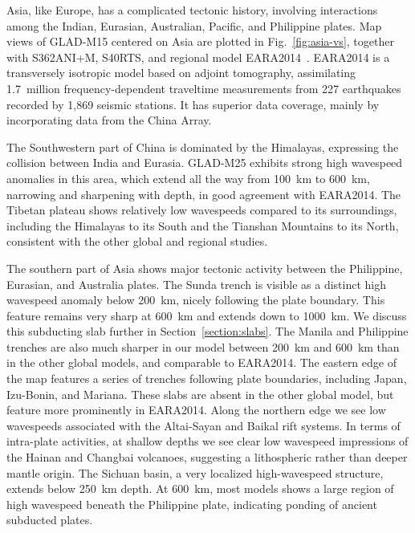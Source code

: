 \documentclass[extra,mreferee]{gji}
\begin{document}
Asia, like Europe, has a complicated tectonic history, involving
interactions among the Indian, Eurasian, Australian, Pacific, and Philippine
plates.
Map views of GLAD-M15 centered on Asia are plotted in Fig.~\ref{fig:asia-vs},
together with S362ANI$+$M, S40RTS, and regional model EARA2014~\citep{chen2015multiparameter}.
EARA2014 is a transversely isotropic model based on adjoint
tomography, assimilating 1.7~million frequency-dependent traveltime
measurements from 227 earthquakes recorded by 1,869 seismic stations.
It has superior data coverage, mainly by incorporating data from the China Array.

The Southwestern part of China is dominated by the Himalayas,
expressing the collision between India and Eurasia.
GLAD-M25 exhibits strong high wavespeed anomalies in this area,
which extend all the way from 100~km to 600~km, narrowing and sharpening with depth,
in good agreement with EARA2014.
The Tibetan plateau shows relatively low wavespeeds
compared to its surroundings, including the Himalayas to its South and
the Tianshan Mountains to its North, consistent with the other global
and regional studies.

The southern part of Asia shows major tectonic activity between the
Philippine, Eurasian, and Australia plates.
The Sunda trench is visible as a distinct high wavespeed anomaly below 200~km,
nicely following the plate boundary.
This feature remains very sharp at 600~km and extends
down to 1000~km.
We discuss this subducting slab further in Section~\ref{section:slabs}.
The Manila and Philippine trenches are also much sharper in our model between 200~km and
600~km than in the other global models, and comparable to EARA2014.
The eastern edge of the map features a series of trenches following plate boundaries,
including Japan, Izu-Bonin, and Mariana.
These slabs are absent in the other global model,
but feature more prominently in EARA2014.
Along the northern edge we see low wavespeeds associated with the
Altai-Sayan and Baikal rift systems.
In terms of intra-plate activities,
at shallow depths we see clear low wavespeed impressions of the Hainan and Changbai volcanoes,
suggesting a lithospheric rather than deeper mantle origin.
The Sichuan basin, a very localized high-wavespeed structure, extends below
250~km depth. At 600~km, most models shows a large region of high wavespeed
beneath the Philippine plate, indicating ponding of ancient subducted plates.
\end{document}
